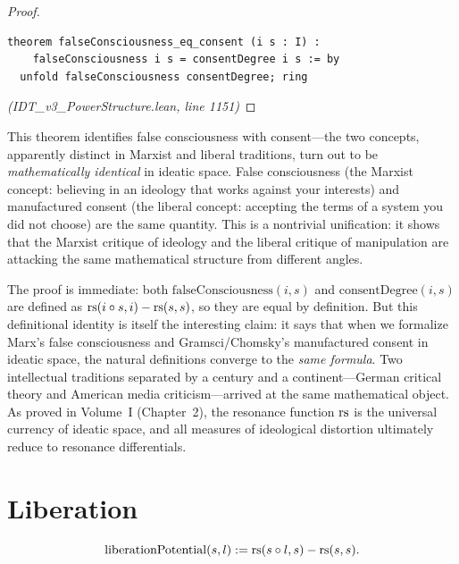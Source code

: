 \begin{proof}
\begin{lstlisting}
theorem falseConsciousness_eq_consent (i s : I) :
    falseConsciousness i s = consentDegree i s := by
  unfold falseConsciousness consentDegree; ring
\end{lstlisting}
\textit{(IDT\_v3\_PowerStructure.lean, line 1151)}
\end{proof}

\begin{interpretation}
This theorem identifies false consciousness with consent---the two concepts,
apparently distinct in Marxist and liberal traditions, turn out to be
\emph{mathematically identical} in ideatic space. False consciousness (the
Marxist concept: believing in an ideology that works against your interests)
and manufactured consent (the liberal concept: accepting the terms of a system
you did not choose) are the same quantity. This is a nontrivial unification:
it shows that the Marxist critique of ideology and the liberal critique of
manipulation are attacking the same mathematical structure from different
angles.
\end{interpretation}

\begin{remark}
The proof is immediate: both $\mathrm{falseConsciousness}(i,s)$ and
$\mathrm{consentDegree}(i,s)$ are defined as $\mathrm{rs}(i \circ s, i) - \mathrm{rs}(s,s)$,
so they are equal by definition. But this definitional identity is itself
the interesting claim: it says that when we formalize Marx's false consciousness
and Gramsci/Chomsky's manufactured consent in ideatic space, the natural
definitions converge to the \emph{same formula}. Two intellectual traditions
separated by a century and a continent---German critical theory and American
media criticism---arrived at the same mathematical object. As proved in
Volume~I (Chapter~2), the resonance function $\mathrm{rs}$ is the universal currency
of ideatic space, and all measures of ideological distortion ultimately reduce
to resonance differentials.
\end{remark}

\section{Liberation}

\begin{definition}
\label{def:liberation}
\[
  \mathrm{liberationPotential}(s, l) := \mathrm{rs}(s \circ l, s) - \mathrm{rs}(s, s).
\]
\end{definition}

